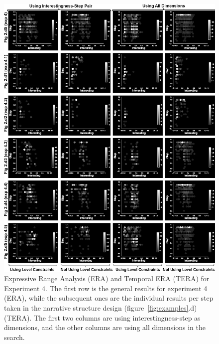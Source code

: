 \begin{figure}[t!]
    \centering
    \includegraphics[width=\linewidth]{figures/experiment-4_fixed.png}
    \caption{Expressive Range Analysis (ERA) and Temporal ERA (TERA) for Experiment 4. The first row is the general results for experiment 4 (ERA), while the subsequent ones are the individual results per step taken in the narrative structure design (figure~\ref{fig:examples}.d) (TERA). The first two columns are using interestingness-step as dimensions, and the other columns are using all dimensions in the search. }
    \label{fig:experiment-stepstep}
\end{figure}


